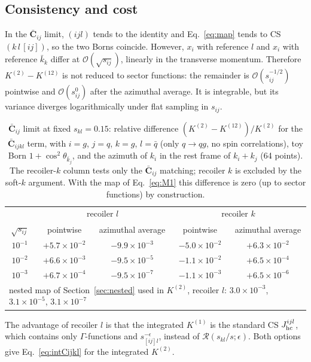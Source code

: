 \documentclass[11pt,a4paper]{article}
\newcommand{\bbC}[1]{\bar{\mathbf C}_{#1}}
\newcommand{\jb}{\bar k_{j}}
\newcommand{\kb}{\bar k_{k}}
\newcommand{\eps}{\epsilon}
\begin{document}
\subsection{Consistency and cost}
In the $\bbC{ij}$ limit, $(ijl)$ tends to the identity and Eq.~\eqref{eq:map} tends to CS $(k\,l\,[ij])$, so the
two Borns coincide. However, $x_i$ with reference $l$ and $x_i$ with reference $\kb$ differ at
$\mathcal O(\sqrt{s_{ij}})$, linearly in the transverse momentum. Therefore $K^{(2)}-K^{(12)}$ is not
reduced to sector functions: the remainder is $\mathcal O(s_{ij}^{-1/2})$ pointwise and
$\mathcal O(s_{ij}^0)$ after the azimuthal average. It is integrable, but its variance diverges
logarithmically under flat sampling in $s_{ij}$.
\begin{table}[h]\centering
\begin{tabular}{ccccc}\toprule
& \multicolumn{2}{c}{recoiler $l$} & \multicolumn{2}{c}{recoiler $k$}\\
$\sqrt{s_{ij}}$ & pointwise & azimuthal average & pointwise & azimuthal average\\\midrule
$10^{-1}$ & $+5.7\times10^{-2}$ & $-9.9\times10^{-3}$ & $-5.0\times10^{-2}$ & $+6.3\times10^{-2}$\\
$10^{-2}$ & $+6.6\times10^{-3}$ & $-9.5\times10^{-5}$ & $-1.1\times10^{-2}$ & $+6.5\times10^{-4}$\\
$10^{-3}$ & $+6.7\times10^{-4}$ & $-9.5\times10^{-7}$ & $-1.1\times10^{-3}$ & $+6.5\times10^{-6}$\\\midrule
\multicolumn{5}{l}{nested map of Section~\ref{sec:nested} used in $K^{(2)}$, recoiler $l$: \quad
$3.0\times10^{-3}$, $3.1\times10^{-5}$, $3.1\times10^{-7}$}\\\bottomrule
\end{tabular}
\caption{$\bbC{ij}$ limit at fixed $s_{kl}=0.15$: relative difference $(K^{(2)}-K^{(12)})/K^{(2)}$ for the
$\bbC{ijkl}$ term, with $i=g$, $j=q$, $k=g$, $l=\bar q$ (only $q\to qg$, no spin correlations), toy Born
$1+\cos^2\theta_{\jb}$, and the azimuth of $k_i$ in the rest frame of $k_i+k_j$ (64 points). The recoiler-$k$ column
tests only the $\bbC{ij}$ matching; recoiler $k$ is excluded by the soft-$k$ argument.
With the map of Eq.~\eqref{eq:M1} this difference is zero (up to sector functions) by construction.}
\label{tab:K2K12}
\end{table}

The advantage of recoiler $l$ is that the integrated $K^{(1)}$ is the standard CS
$J^{ijl}_{\rm hc}$, which contains only $\Gamma$-functions and $s_{[ij]l}^{-\eps}$, instead of
$\mathcal R(s_{kl}/s;\eps)$. Both options give Eq.~\eqref{eq:intCijkl} for the integrated $K^{(2)}$.
\end{document}
